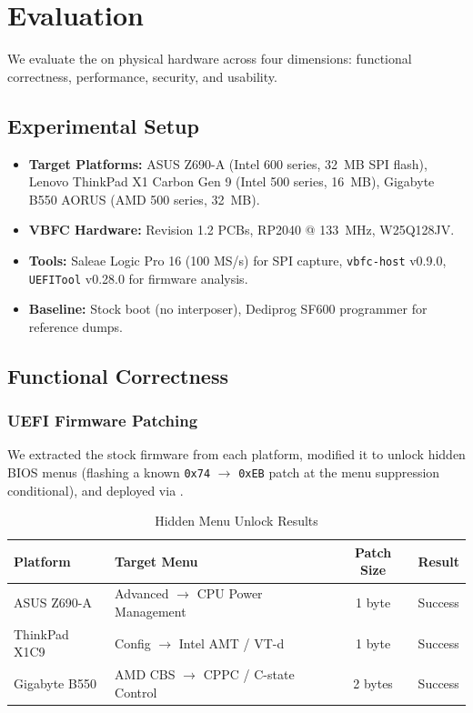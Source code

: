 \section{Evaluation}
\label{sec:evaluation}

We evaluate the \vbfc on physical hardware across four dimensions: functional correctness, performance, security, and usability.

\subsection{Experimental Setup}
\begin{itemize}
    \item \textbf{Target Platforms:} ASUS Z690-A (Intel 600 series, \SI{32}{MB} SPI flash), Lenovo ThinkPad X1 Carbon Gen 9 (Intel 500 series, \SI{16}{MB}), Gigabyte B550 AORUS (AMD 500 series, \SI{32}{MB}).
    \item \textbf{VBFC Hardware:} Revision 1.2 PCBs, RP2040 @ \SI{133}{MHz}, W25Q128JV.
    \item \textbf{Tools:} Saleae Logic Pro 16 (100 MS/s) for SPI capture, \texttt{vbfc-host} v0.9.0, \texttt{UEFITool} v0.28.0 for firmware analysis.
    \item \textbf{Baseline:} Stock boot (no interposer), Dediprog SF600 programmer for reference dumps.
\end{itemize}

\subsection{Functional Correctness}

\subsubsection{UEFI Firmware Patching}
We extracted the stock firmware from each platform, modified it to unlock hidden \ac{BIOS} menus (flashing a known \texttt{0x74} $\to$ \texttt{0xEB} patch at the menu suppression conditional), and deployed via \vbfc.

\begin{table}[h]
\centering
\caption{Hidden Menu Unlock Results}
\label{tab:menu_unlock}
\begin{tabular}{@{}llcc@{}}
\toprule
\textbf{Platform} & \textbf{Target Menu} & \textbf{Patch Size} & \textbf{Result} \\
\midrule
ASUS Z690-A     & Advanced $\to$ CPU Power Management & 1 byte & Success \\
ThinkPad X1C9   & Config $\to$ Intel AMT / VT-d & 1 byte & Success \\
Gigabyte B550   & AMD CBS $\to$ CPPC / C-state Control & 2 bytes & Success \\
\bottomrule
\end{tabular}
\end{table}

